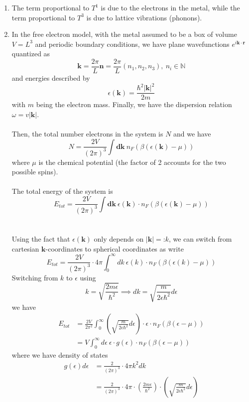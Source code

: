 \documentclass[11pt]{article}
\begin{document}
\begin{enumerate}
  \item The term proportional to $T^1$ is due to the electrons in the metal, while the term proportional to $T^3$ is due to lattice vibrations (phonons).
  

  \item In the free electron model, with the metal assumed to be a box of volume $V = L^3$ and periodic boundary conditions, we have plane wavefunctions $e^{i\mathbf{k} \cdot \mathbf{r}}$ quantized as $$\mathbf{k} = \frac{2\pi}{L}\mathbf{n} = \frac{2\pi}{L} (n_1, n_2, n_3),~n_i \in \mathbb{N}$$ and energies described by $$ \epsilon(\mathbf{k}) = \frac{\hbar^2 |\mathbf{k}|^2}{2m} $$ with $m$ being the electron mass. Finally, we have the dispersion relation $\omega = v |\mathbf{k}|$.
  \\
  \\
  Then, the total number electrons in the system is $N$ and we have $$ N = \frac{2V}{(2\pi)^3} \int \mathbf{dk}~n_F(\beta(\epsilon(\mathbf{k}) - \mu)) $$ where $\mu$ is the chemical potential (the factor of 2 accounts for the two possible spins).
  \\
  \\
  The total energy of the system is $$ E_{tot} = \frac{2V}{(2\pi)^3} \int \mathbf{dk}~\epsilon(\mathbf{k}) \cdot n_F(\beta(\epsilon(\mathbf{k}) - \mu))  $$
  \\
  \\
  Using the fact that $\epsilon(\mathbf{k})$ only depends on $|\mathbf{k}| =\text{:} k$, we can switch from cartesian $\mathbf{k}$-coordinates to spherical coordinates as write $$ E_{tot} = \frac{2V}{(2\pi)^3} \cdot 4\pi \int_0 ^{\infty} dk~\epsilon(k) \cdot n_F(\beta(\epsilon(k) - \mu))  $$ Switching from $k$ to $\epsilon$ using $$ k = \sqrt{\frac{2m\epsilon}{\hbar^2}} \implies dk = \sqrt{\frac{m}{2\epsilon\hbar^2}} d\epsilon $$ we have 
  \begin{align*}
    E_{tot} &= \frac{2V}{2\pi^2} \int_0^{\infty} \left(\sqrt{\frac{m}{2\epsilon\hbar^2}} d\epsilon\right) \cdot \epsilon \cdot n_F(\beta(\epsilon - \mu)) \\
    &= V \int_{0}^{\infty} d\epsilon~\epsilon \cdot g(\epsilon) \cdot n_F(\beta(\epsilon - \mu))
  \end{align*} where we have density of states 
  \begin{align*}
    g(\epsilon) d\epsilon &= \frac{2}{(2\pi)^3} \cdot 4\pi k^2 dk \\
    &= \frac{2}{(2\pi)^3} \cdot 4\pi \cdot \left( \frac{2m\epsilon}{\hbar^2} \right) \cdot \left( \sqrt{\frac{m}{2\epsilon \hbar^2}} d\epsilon \right) \\

\end{align*}
\end{enumerate}
\end{document}
